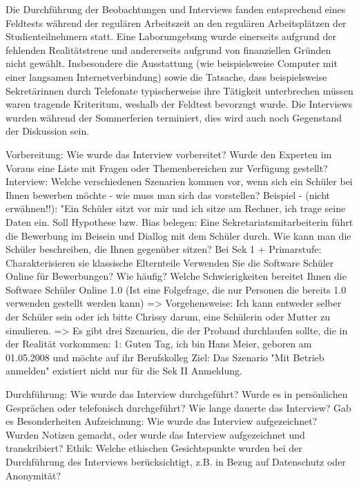 Die Durchführung der Beobachtungen und Interviews fanden entsprechend eines Feldtests während der regulären Arbeitszeit an den regulären Arbeitsplätzen der Studienteilnehmern statt. Eine Laborumgebung wurde einerseits aufgrund der fehlenden Realitätstreue und andererseits aufgrund von finanziellen Gründen nicht gewählt. Insbesondere die Ausstattung (wie beispielsweise Computer mit einer langsamen Internetverbindung) sowie die Tatsache, dass beispielsweise Sekretärinnen durch Telefonate typischerweise ihre Tätigkeit unterbrechen müssen waren tragende Kriteritum, weshalb der Feldtest bevorzugt wurde. Die Interviews wurden während der Sommerferien terminiert, dies wird auch noch Gegenstand der Diskussion sein.

Vorbereitung: Wie wurde das Interview vorbereitet? Wurde den Experten im Voraus eine Liste mit Fragen oder Themenbereichen zur Verfügung gestellt?
Interview: Welche verschiedenen Szenarien kommen vor, wenn sich ein Schüler bei Ihnen bewerben möchte - wie muss man sich das vorstellen?
Beispiel - (nicht erwähnen!!): "Ein Schüler sitzt vor mir und ich sitze am Rechner, ich trage seine Daten ein.
Soll Hypothese bzw. Bias belegen: Eine Sekretariatsmitarbeiterin führt die Bewerbung im Beisein und Diallog mit dem Schüler durch.
Wie kann man die Schüler beschreiben, die Ihnen gegenüber sitzen?
Bei Sek 1 + Primarstufe: Charakterisieren sie klassische Elternteile
Verwenden Sie die Software Schüler Online für Bewerbungen?
Wie häufig?
Welche Schwierigkeiten bereitet Ihnen die Software Schüler Online 1.0 (Ist eine Folgefrage, die nur Personen die bereits 1.0 verwenden gestellt werden kann)
=> Vorgehensweise: Ich kann entweder selber der Schüler sein oder ich bitte Chrissy darum, eine Schülerin oder Mutter zu simulieren.
=> Es gibt drei Szenarien, die der Proband durchlaufen sollte, die in der Realität vorkommen:
    1: Guten Tag, ich bin Hans Meier, geboren am 01.05.2008 und möchte auf ihr Berufskolleg
    Ziel: 
    Das Szenario "Mit Betrieb anmelden" existiert nicht nur für die Sek II Anmeldung.
 
 Durchführung: Wie wurde das Interview durchgeführt? Wurde es in persönlichen Gesprächen oder telefonisch durchgeführt? Wie lange dauerte das Interview? Gab es Besonderheiten %
 Aufzeichnung: Wie wurde das Interview aufgezeichnet? Wurden Notizen gemacht, oder wurde das Interview aufgezeichnet und transkribiert?
 Ethik: Welche ethischen Gesichtspunkte wurden bei der Durchführung des Interviews berücksichtigt, z.B. in Bezug auf Datenschutz oder Anonymität?
 
